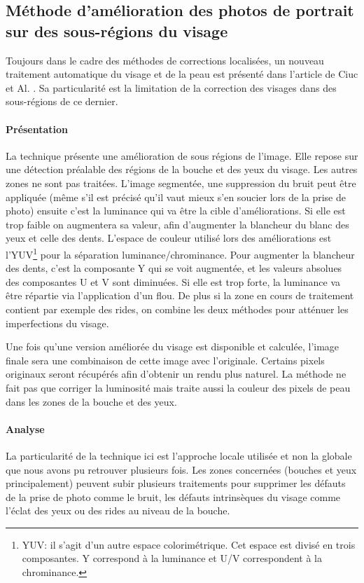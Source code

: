 \documentclass[11pt, french,screen]{report-rd-info}
\begin{document}
\subsection{Méthode d’amélioration des photos de portrait sur des sous-régions du visage}
Toujours dans le cadre des méthodes de corrections localisées, un nouveau traitement automatique du visage et de la peau est présenté dans l’article de Ciuc et Al. \cite{Ciuc2010}. Sa particularité est la limitation de la correction des visages dans des sous-régions de ce dernier.
\paragraph{Présentation}
La technique présente une amélioration de sous régions de l’image.  Elle repose sur une détection préalable des régions de la bouche et des yeux du visage. Les autres zones ne sont pas traitées.
L’image segmentée, une suppression du bruit peut être appliquée (même s’il est précisé qu’il vaut mieux s’en soucier lors de la prise de photo) ensuite c’est la luminance qui va être la cible d’améliorations. Si elle est trop faible on augmentera sa valeur, afin d’augmenter la blancheur du blanc des yeux et celle des dents. L’espace de couleur utilisé lors des améliorations est l’YUV\footnote{YUV: il s'agit d'un autre espace colorimétrique. Cet espace est divisé en trois composantes. Y correspond à la luminance et U/V correspondent à la chrominance.} pour la séparation luminance/chrominance. Pour augmenter la blancheur des dents, c’est la composante Y qui se voit augmentée, et les valeurs absolues des composantes U et V sont diminuées.
Si elle est trop forte, la luminance va être répartie via l’application d’un flou. De plus si la zone en cours de traitement contient par exemple des rides, on combine les deux méthodes pour atténuer les imperfections du visage.

Une fois qu’une version améliorée du visage est disponible et calculée, l’image finale sera une combinaison de cette image avec l’originale. Certains pixels originaux seront récupérés afin d’obtenir un rendu plus naturel.
La méthode ne fait pas que corriger la luminosité mais traite aussi la couleur des pixels de peau dans les zones de la bouche et des yeux.
\paragraph{Analyse}
La particularité de la technique ici est l’approche locale utilisée et non la globale que nous avons pu retrouver plusieurs fois. Les zones concernées (bouches et yeux principalement) peuvent subir plusieurs traitements pour supprimer les défauts de la prise de photo comme le bruit, les défauts intrinsèques du visage comme l’éclat des yeux ou des rides au niveau de la bouche.
\end{document}
